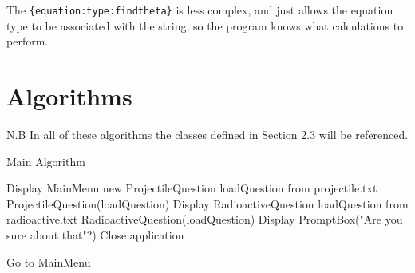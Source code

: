The \texttt{\{equation:type:findtheta\}} is less complex, and just allows the equation type to be associated with the string, so the program knows what calculations to perform.
\clearpage
\section{Algorithms}
N.B In all of these algorithms the classes defined in Section 2.3 will be referenced.
\begin{algorithm}
	\label{mainps}
	\caption{Main Algorithm}
	\begin{algorithmic}[1]
		\State Display MainMenu
			\State new ProjectileQuestion
			\State loadQuestion from projectile.txt
			\State ProjectileQuestion(loadQuestion)
		\EndIf
			\State Display RadioactiveQuestion
			\State loadQuestion from radioactive.txt
			\State RadioactiveQuestion(loadQuestion)
		\EndIf
			\State Display PromptBox("Are you sure about that"?)
				\State Close application
			
			\Else
				\State Go to MainMenu
			\EndIf
		\EndIf
	\end{algorithmic}
\end{algorithm}